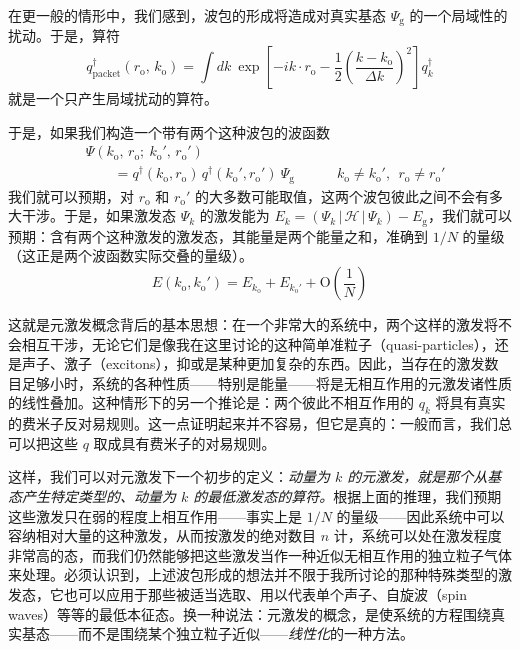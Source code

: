在更一般的情形中，我们感到，波包的形成将造成对真实基态 $\Psi_{\mathrm{g}}$ 的一个局域性的扰动。于是，算符
\begin{equation*}
q^{\dagger}_{\text{packet}}(r_{\mathrm{o}},\,k_{\mathrm{o}})=\int dk\ \exp\left[-ik\cdot r_{\mathrm{o}}-\frac{1}{2}\left(\frac{k-k_{\mathrm{o}}}{\Delta k}\right)^{2}\right]q^{\dagger}_{k}
\end{equation*}
就是一个只产生局域扰动的算符。

于是，如果我们构造一个带有两个这种波包的波函数
\begin{align*}
&\Psi(k_{\mathrm{o}},\,r_{\mathrm{o}};\ k_{\mathrm{o}}',\,r_{\mathrm{o}}')\\
&\qquad=q^{\dagger}(k_{\mathrm{o}},r_{\mathrm{o}})\,q^{\dagger}(k_{\mathrm{o}}',r_{\mathrm{o}}')\ \Psi_{\mathrm{g}}\qquad\quad k_{\mathrm{o}}\neq k_{\mathrm{o}}',\ \ r_{\mathrm{o}}\neq r_{\mathrm{o}}'
\end{align*}
我们就可以预期，对 $r_{\mathrm{o}}$ 和 $r_{\mathrm{o}}'$ 的大多数可能取值，这两个波包彼此之间不会有多大干涉。于是，如果激发态 $\Psi_{k}$ 的激发能为 $E_{k}=(\Psi_{k}\,|\,\mathcal{H}\,|\,\Psi_{k})-E_{\mathrm{g}}$，我们就可以预期：含有两个这种激发的激发态，其能量是两个能量之和，准确到 $1/N$ 的量级（这正是两个波函数实际交叠的量级）。
\begin{equation*}
E(k_{\mathrm{o}},k_{\mathrm{o}}')=E_{k_{\mathrm{o}}}+E_{k_{\mathrm{o}}'}+\mathrm{O}\left(\frac{1}{N}\right)
\end{equation*}

这就是元激发概念背后的基本思想：在一个非常大的系统中，两个这样的激发将不会相互干涉，无论它们是像我在这里讨论的这种简单准粒子（quasi-particles），还是声子、激子（excitons），抑或是某种更加复杂的东西。因此，当存在的激发数目足够小时，系统的各种性质——特别是能量——将是无相互作用的元激发诸性质的线性叠加。这种情形下的另一个推论是：两个彼此不相互作用的 $q_{k}$ 将具有真实的费米子反对易规则。这一点证明起来并不容易，但它是真的：一般而言，我们总可以把这些 $q$ 取成具有费米子的对易规则。

这样，我们可以对元激发下一个初步的定义：\emph{动量为 $k$ 的元激发，就是那个从基态产生特定类型的、动量为 $k$ 的最低激发态的算符。}根据上面的推理，我们预期这些激发只在弱的程度上相互作用——事实上是 $1/N$ 的量级——因此系统中可以容纳相对大量的这种激发，从而按激发的绝对数目 $n$ 计，系统可以处在激发程度非常高的态，而我们仍然能够把这些激发当作一种近似无相互作用的独立粒子气体来处理。必须认识到，上述波包形成的想法并不限于我所讨论的那种特殊类型的激发态，它也可以应用于那些被适当选取、用以代表单个声子、自旋波（spin waves）等等的最低本征态。换一种说法：元激发的概念，是使系统的方程围绕真实基态——而不是围绕某个独立粒子近似——\emph{线性化}的一种方法。

